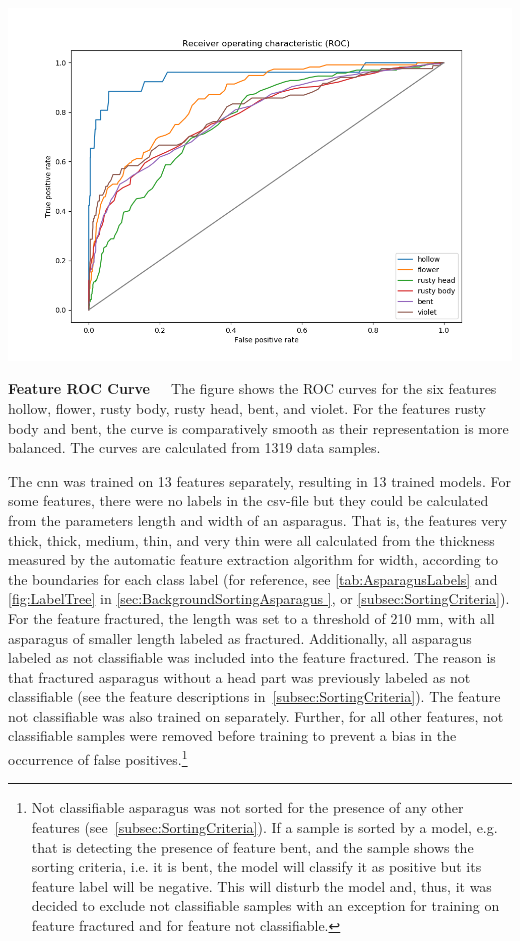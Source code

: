 \begin{table}[!htb]
	\centering
	\includegraphics[scale=0.6]{Figures/chapter04/singellabelROC.png}
	\decoRule
	\caption[Single-Label CNN ROC Curve]{\textbf{Feature ROC Curve}~~~The figure shows the ROC curves for the six features hollow, flower, rusty body, rusty head, bent, and violet. For the features rusty body and bent, the curve is comparatively smooth as their representation is more balanced. The curves are calculated from 1319 data samples.}
	\label{fig:SingleLabelROC}
\end{table}

The \acrshort{cnn} was trained on 13 features separately, resulting in 13 trained models. For some features, there were no labels in the csv-file but they could be calculated from the parameters length and width of an asparagus. That is, the features very thick, thick, medium, thin, and very thin were all calculated from the thickness measured by the automatic feature extraction algorithm for width, according to the boundaries for each class label (for reference, see \autoref{tab:AsparagusLabels} and \autoref{fig:LabelTree} in \autoref{sec:BackgroundSortingAsparagus }, or \autoref{subsec:SortingCriteria}). For the feature fractured, the length was set to a threshold of 210 mm, with all asparagus of smaller length labeled as fractured. Additionally, all asparagus labeled as not classifiable was included into the feature fractured. The reason is that fractured asparagus without a head part was previously labeled as not classifiable (see the feature descriptions in~\autoref{subsec:SortingCriteria}). The feature not classifiable was also trained on separately. Further, for all other features, not classifiable samples were removed before training to prevent a bias in the occurrence of false positives.\footnote{Not classifiable asparagus was not sorted for the presence of any other features (see~\autoref{subsec:SortingCriteria}). If a sample is sorted by a model, e.g. that is detecting the presence of feature bent, and the sample shows the sorting criteria, i.e. it is bent, the model will classify it as positive but its feature label will be negative. This will disturb the model and, thus, it was decided to exclude not classifiable samples with an exception for training on feature fractured and for feature not classifiable.}

